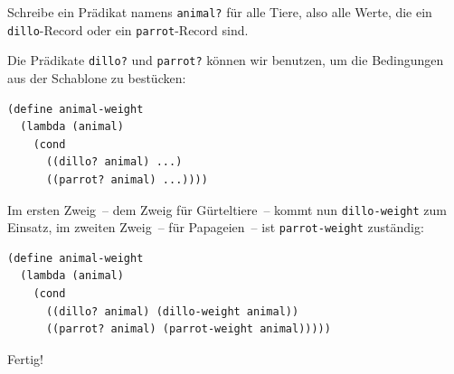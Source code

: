 \begin{aufgabeinline}
  Schreibe ein Prädikat namens \lstinline{animal?} für alle Tiere,
  also alle Werte, die ein \lstinline{dillo}-Record oder ein
  \lstinline{parrot}-Record sind.
\end{aufgabeinline}
%
Die Prädikate \lstinline{dillo?}  und \lstinline{parrot?}  können wir
benutzen, um die Bedingungen aus der Schablone zu bestücken:
%
\begin{lstlisting}
(define animal-weight
  (lambda (animal)
    (cond
      ((dillo? animal) ...)
      ((parrot? animal) ...))))
\end{lstlisting}
%
Im ersten Zweig~-- dem Zweig für Gürteltiere~-- kommt nun
\lstinline{dillo-weight} zum Einsatz, im zweiten Zweig~-- für
Papageien~-- ist \lstinline{parrot-weight} zuständig:
%
\begin{lstlisting}
(define animal-weight
  (lambda (animal)
    (cond
      ((dillo? animal) (dillo-weight animal))
      ((parrot? animal) (parrot-weight animal)))))
\end{lstlisting}
% 
Fertig!

